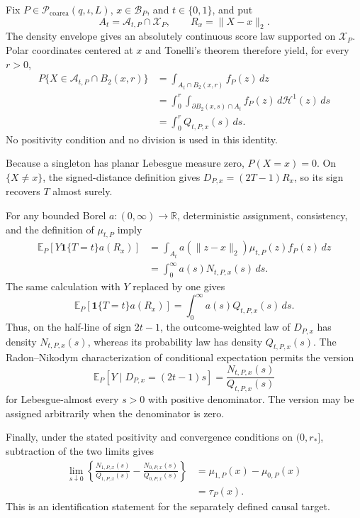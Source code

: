 Fix \(P\in\mathcal P_{\mathrm{coarea}}(q,\iota,L)\), \(x\in\mathcal B_P\), and \(t\in\{0,1\}\), and put
\[
 A_t=\mathcal A_{t,P}\cap\mathcal X_P,
 \qquad R_x=\lVert X-x\rVert_2.
\]
The density envelope gives an absolutely continuous score law supported on \(\mathcal X_P\).  Polar coordinates centered at \(x\) and Tonelli's theorem therefore yield, for every \(r>0\),
\[
\begin{aligned}
 P\{X\in\mathcal A_{t,P}\cap B_2(x,r)\}
 &=\int_{A_t\cap B_2(x,r)}f_P(z)\,dz\\
 &=\int_0^r\int_{\partial B_2(x,s)\cap A_t}
 f_P(z)\,d\mathcal H^1(z)\,ds\\
 &=\int_0^rQ_{t,P,x}(s)\,ds.
\end{aligned}
\]
No positivity condition and no division is used in this identity.

Because a singleton has planar Lebesgue measure zero, \(P(X=x)=0\).  On \(\{X\neq x\}\), the signed-distance definition gives \(D_{P,x}=(2T-1)R_x\), so its sign recovers \(T\) almost surely.

For any bounded Borel \(a:(0,\infty)\to\mathbb R\), deterministic assignment, consistency, and the definition of \(\mu_{t,P}\) imply
\[
\begin{aligned}
 \mathbb E_P[Y\mathbf1\{T=t\}a(R_x)]
 &=\int_{A_t}a(\lVert z-x\rVert_2)\mu_{t,P}(z)f_P(z)\,dz\\
 &=\int_0^\infty a(s)N_{t,P,x}(s)\,ds.
\end{aligned}
\]
The same calculation with \(Y\) replaced by one gives
\[
 \mathbb E_P[\mathbf1\{T=t\}a(R_x)]
 =\int_0^\infty a(s)Q_{t,P,x}(s)\,ds.
\]
Thus, on the half-line of sign \(2t-1\), the outcome-weighted law of \(D_{P,x}\) has density \(N_{t,P,x}(s)\), whereas its probability law has density \(Q_{t,P,x}(s)\).  The Radon--Nikodym characterization of conditional expectation permits the version
\[
 \mathbb E_P[Y\mid D_{P,x}=(2t-1)s]
 =\frac{N_{t,P,x}(s)}{Q_{t,P,x}(s)}
\]
for Lebesgue-almost every \(s>0\) with positive denominator.  The version may be assigned arbitrarily when the denominator is zero.

Finally, under the stated positivity and convergence conditions on \((0,r_*]\), subtraction of the two limits gives
\[
\begin{aligned}
 \lim_{s\downarrow0}\left\{
 \frac{N_{1,P,x}(s)}{Q_{1,P,x}(s)}-
 \frac{N_{0,P,x}(s)}{Q_{0,P,x}(s)}\right\}
 &=\mu_{1,P}(x)-\mu_{0,P}(x)\\
 &=\tau_P(x).
\end{aligned}
\]
This is an identification statement for the separately defined causal target.